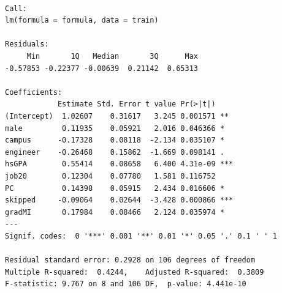 \documentclass[
  letterpaper,
  DIV=11,
  numbers=noendperiod]{scrartcl}
\begin{document}
\begin{verbatim}

Call:
lm(formula = formula, data = train)

Residuals:
     Min       1Q   Median       3Q      Max 
-0.57853 -0.22377 -0.00639  0.21142  0.65313 

Coefficients:
            Estimate Std. Error t value Pr(>|t|)    
(Intercept)  1.02607    0.31617   3.245 0.001571 ** 
male         0.11935    0.05921   2.016 0.046366 *  
campus      -0.17328    0.08118  -2.134 0.035107 *  
engineer    -0.26468    0.15862  -1.669 0.098141 .  
hsGPA        0.55414    0.08658   6.400 4.31e-09 ***
job20        0.12304    0.07780   1.581 0.116752    
PC           0.14398    0.05915   2.434 0.016606 *  
skipped     -0.09064    0.02644  -3.428 0.000866 ***
gradMI       0.17984    0.08466   2.124 0.035974 *  
---
Signif. codes:  0 '***' 0.001 '**' 0.01 '*' 0.05 '.' 0.1 ' ' 1

Residual standard error: 0.2928 on 106 degrees of freedom
Multiple R-squared:  0.4244,    Adjusted R-squared:  0.3809 
F-statistic: 9.767 on 8 and 106 DF,  p-value: 4.441e-10
\end{verbatim}
\end{document}
